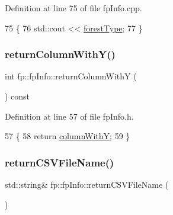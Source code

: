 Definition at line 75 of file fp\+Info.\+cpp.


\begin{DoxyCode}
75                                 \{
76         std::cout << \hyperlink{classfp_1_1fpInfo_a3001fbf80d86022e53578d6adf133b90}{forestType};
77     \}
\end{DoxyCode}
\mbox{\label{classfp_1_1fpInfo_a288c05e4f29935aec7f32dc3c947e9d4}} 
\subsubsection{\texorpdfstring{return\+Column\+With\+Y()}{returnColumnWithY()}}
{\footnotesize\ttfamily int fp\+::fp\+Info\+::return\+Column\+WithY (\begin{DoxyParamCaption}{ }\end{DoxyParamCaption}) const\hspace{0.3cm}{\ttfamily [inline]}}



Definition at line 57 of file fp\+Info.\+h.


\begin{DoxyCode}
57                                                 \{
58                 \textcolor{keywordflow}{return} \hyperlink{classfp_1_1fpInfo_ac29e135cd84cdef547b678e7ea37f92d}{columnWithY};
59             \}
\end{DoxyCode}
\mbox{\label{classfp_1_1fpInfo_a78c57a1955263d343c794f2156cd0a76}} 
\subsubsection{\texorpdfstring{return\+C\+S\+V\+File\+Name()}{returnCSVFileName()}}
{\footnotesize\ttfamily std\+::string\& fp\+::fp\+Info\+::return\+C\+S\+V\+File\+Name (\begin{DoxyParamCaption}{ }\end{DoxyParamCaption})\hspace{0.3cm}{\ttfamily [inline]}}



